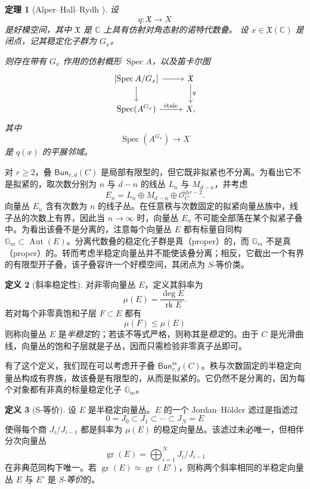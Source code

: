 \documentclass{amsart}
\newtheorem{thm}{定理}[section]
\theoremstyle{definition}
\newtheorem{defn}[thm]{定义}
\theoremstyle{remark}
\theoremstyle{plain}
\theoremstyle{definition}
\theoremstyle{remark}
\newcommand{\G}{\mathbb{G}}
\newcommand{\C}{\mathbb{C}}
\newcommand{\mc}[1]{\mathcal{#1}}
\newcommand{\mf}[1]{\mathfrak{#1}}
\newcommand{\mr}[1]{\mathrm{#1}}
\newcommand{\on}[1]{\operatorname{#1}}
\newcommand{\ms}[1]{\mathsf{#1}}
\newcommand{\1}{\mathbf{1}}
\newcommand{\2}{\mathbf{2}}
\newcommand{\3}{\mathbf{3}}
\begin{document}
\begin{thm}[Alper--Hall--Rydh {\cite{AHR2020}}]
    设
    \[
        q\colon \mf{X}\longrightarrow X
    \]
    是好模空间，其中 \(\mf{X}\) 是 \(\C\) 上具有仿射对角态射的诺特代数叠。
    设 \(x\in\mf{X}(\C)\) 是闭点，记其稳定化子群为 \(G_x\)。

    则存在带有 \(G_x\) 作用的仿射概形 \(\on{Spec}A\)，以及笛卡尔图
    \[
        \begin{tikzcd}
            {[\on{Spec}A/G_x]}
                \arrow[r]
                \arrow[d]
            & \mf{X}
                \arrow[d, "q"]
            \\
            \on{Spec}(A^{G_x})
                \arrow[r, "\mathrm{\acute{e}tale}"]
            & X,
        \end{tikzcd}
    \]
    其中
    \[
        \on{Spec}(A^{G_x})\longrightarrow X
    \]
    是 \(q(x)\) 的平展邻域。
\end{thm}

对 \(r\geq 2\)，叠 \(\ms{Bun}_{r,d}(C)\) 是局部有限型的，但它既非拟紧也不分离。为看出它不是拟紧的，取次数分别为 \(n\) 与 \(d-n\) 的线丛 \(L_n\) 与 \(M_{d-n}\)，并考虑
\[
    E_n=L_n\oplus M_{d-n}\oplus\mc{O}_C^{\oplus r-2}.
\]
向量丛 \(E_n\) 含有次数为 \(n\) 的线子丛。在任意秩与次数固定的拟紧向量丛族中，线子丛的次数上有界，因此当 \(n\to\infty\) 时，向量丛 \(E_n\) 不可能全部落在某个拟紧子叠中。为看出该叠不是分离的，注意每个向量丛 \(E\) 都有标量自同构 \(\G_m\subset\on{Aut}(E)\)。分离代数叠的稳定化子群是真（proper）的，而 \(\G_m\) 不是真（proper）的。转而考虑半稳定向量丛并不能使该叠分离；相反，它截出一个有界的有限型开子叠，该子叠容许一个好模空间，其闭点为 \(S\)-等价类。

\begin{defn}[斜率稳定性]
    对非零向量丛 \(E\)，定义其斜率为
    \[ \mu(E)=\frac{\deg E}{\on{rk}E}. \]
    若对每个非零真饱和子层 \(F\subset E\) 都有
    \[ \mu(F)\leq\mu(E) \]
    则称向量丛 \(E\) 是\textit{半稳定}的；若该不等式严格，则称其是\textit{稳定}的。由于 \(C\) 是光滑曲线，向量丛的饱和子层就是子丛，因而只需检验非零真子丛即可。
\end{defn}

有了这个定义，我们现在可以考虑开子叠 \(\ms{Bun}_{r,d}^{\mr{ss}}(C)\)。秩与次数固定的半稳定向量丛构成有界族，故该叠是有限型的，从而是拟紧的。它仍然不是分离的，因为每个对象都有非真的标量稳定化子 \(\G_m\)。

\begin{defn}[S-等价]
    设 \(E\) 是半稳定向量丛。\(E\) 的一个 Jordan--H\"older 滤过是指滤过
    \[ 0=J_0\subset J_1\subset\cdots\subset J_N=E \]
    使得每个商 \(J_i/J_{i-1}\) 都是斜率为 \(\mu(E)\) 的稳定向量丛。该滤过未必唯一，但相伴分次向量丛
    \[
        \on{gr}(E)=\bigoplus_{i=1}^N J_i/J_{i-1}
    \]
    在非典范同构下唯一。若 \(\on{gr}(E)\simeq\on{gr}(E')\)，则称两个斜率相同的半稳定向量丛 \(E\) 与 \(E'\) 是 \textit{S-等价}的。
\end{defn}
\end{document}

